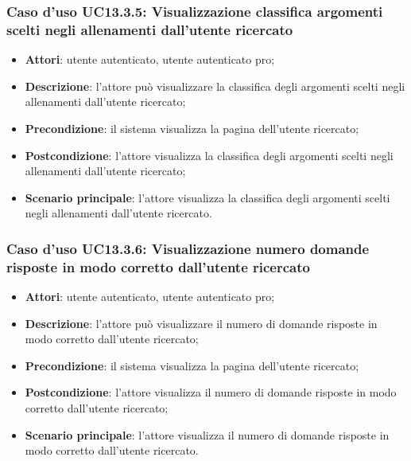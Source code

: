 \subsubsection{Caso d'uso UC13.3.5: Visualizzazione classifica argomenti scelti negli allenamenti dall'utente ricercato}
\begin{itemize}
	\item\textbf{Attori}: utente autenticato, utente autenticato pro;
	\item\textbf{Descrizione}: l'attore può visualizzare la classifica degli argomenti scelti negli allenamenti dall'utente ricercato;
	\item\textbf{Precondizione}: il sistema visualizza la pagina dell'utente ricercato;
	\item\textbf{Postcondizione}: l'attore visualizza la classifica degli argomenti scelti negli allenamenti dall'utente ricercato;
	\item\textbf{Scenario principale}: l'attore visualizza la classifica degli argomenti scelti negli allenamenti dall'utente ricercato.
\end{itemize}

\subsubsection{Caso d'uso UC13.3.6: Visualizzazione numero domande risposte in modo corretto dall'utente ricercato}
\begin{itemize}
	\item\textbf{Attori}: utente autenticato, utente autenticato pro;
	\item\textbf{Descrizione}: l'attore può visualizzare il numero di domande risposte in modo corretto dall'utente ricercato;
	\item\textbf{Precondizione}: il sistema visualizza la pagina dell'utente ricercato;
	\item\textbf{Postcondizione}: l'attore visualizza il numero di domande risposte in modo corretto dall'utente ricercato;
	\item\textbf{Scenario principale}: l'attore visualizza il numero di domande risposte in modo corretto dall'utente ricercato.
\end{itemize}

